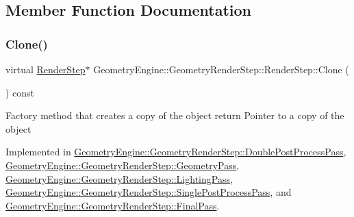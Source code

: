 \subsection{Member Function Documentation}
\mbox{\label{class_geometry_engine_1_1_geometry_render_step_1_1_render_step_afe33ea9d82c5be11f55af7d39691d44b}} 
\subsubsection{\texorpdfstring{Clone()}{Clone()}}
{\footnotesize\ttfamily virtual \mbox{\hyperlink{class_geometry_engine_1_1_geometry_render_step_1_1_render_step}{Render\+Step}}$\ast$ Geometry\+Engine\+::\+Geometry\+Render\+Step\+::\+Render\+Step\+::\+Clone (\begin{DoxyParamCaption}{ }\end{DoxyParamCaption}) const\hspace{0.3cm}{\ttfamily [pure virtual]}}

Factory method that creates a copy of the object return Pointer to a copy of the object 

Implemented in \mbox{\hyperlink{class_geometry_engine_1_1_geometry_render_step_1_1_double_post_process_pass_a080175b6caf11b9b0e84b5c41c87d39a}{Geometry\+Engine\+::\+Geometry\+Render\+Step\+::\+Double\+Post\+Process\+Pass}}, \mbox{\hyperlink{class_geometry_engine_1_1_geometry_render_step_1_1_geometry_pass_a12e85a0169cb7b92cb8bd7b7fe100b33}{Geometry\+Engine\+::\+Geometry\+Render\+Step\+::\+Geometry\+Pass}}, \mbox{\hyperlink{class_geometry_engine_1_1_geometry_render_step_1_1_lighting_pass_a4f1cb36c7bf6a90d0aa3b8e8feba5e5e}{Geometry\+Engine\+::\+Geometry\+Render\+Step\+::\+Lighting\+Pass}}, \mbox{\hyperlink{class_geometry_engine_1_1_geometry_render_step_1_1_single_post_process_pass_adbbe0bb9d41386ced4080877f030407a}{Geometry\+Engine\+::\+Geometry\+Render\+Step\+::\+Single\+Post\+Process\+Pass}}, and \mbox{\hyperlink{class_geometry_engine_1_1_geometry_render_step_1_1_final_pass_a6633ed9c32944cc390d2b0ab32225845}{Geometry\+Engine\+::\+Geometry\+Render\+Step\+::\+Final\+Pass}}.

\mbox{\label{class_geometry_engine_1_1_geometry_render_step_1_1_render_step_afe0321446beeb4093dba701424ec1e8c}} 

